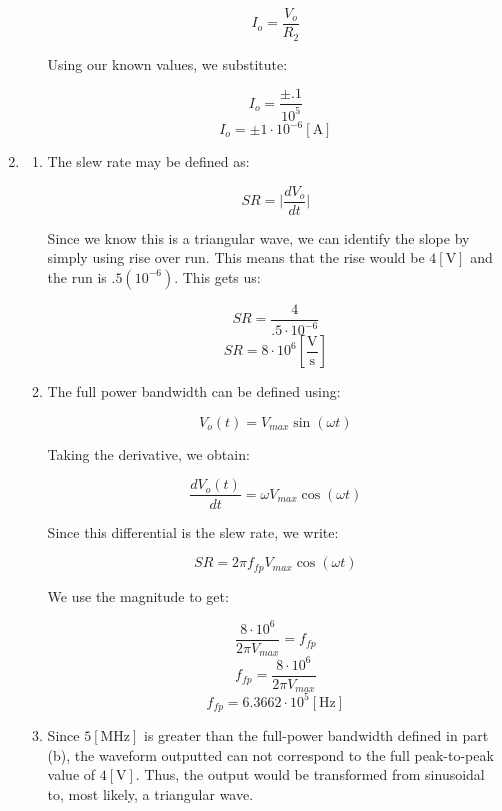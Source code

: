 \begin{enumerate}
\begin{enumerate}
        $$I_o=\frac{V_o}{R_2}$$

        Using our known values, we substitute:

        $$I_o=\frac{\pm.1}{10^5}$$
        $$\boxed{I_o=\pm1\cdot10^{-6}[\si{\ampere}]}$$

    \end{enumerate}

  \item

    \begin{enumerate}

      \item 

        The slew rate may be defined as:

        $$SR=\Big|\frac{dV_o}{dt}\Big|$$

        Since we know this is a triangular wave, we can identify the slope by simply using rise over run. This means that the rise would be $4[\si{\volt}]$ and the run is $.5(10^{-6})$. This gets us:

        $$SR=\frac{4}{.5\cdot10^{-6}}$$
        $$\boxed{SR=8\cdot10^{6}\left[ \frac{\si{\volt}}{\si{\second}} \right]}$$

      \item 

        The full power bandwidth can be defined using:

        $$V_o(t)=V_{max}\sin(\omega t)$$

        Taking the derivative, we obtain:

        $$\frac{dV_o(t)}{dt}=\omega V_{max}\cos(\omega t)$$

        Since this differential is the slew rate, we write:

        $$SR=2\pi f_{fp} V_{max}\cos(\omega t)$$

        We use the magnitude to get:

        $$\frac{8\cdot10^{6}}{2\pi V_{max}}=f_{fp}$$
        $$f_{fp}=\frac{8\cdot10^{6}}{2\pi V_{max}}$$
        $$\boxed{f_{fp}=6.3662\cdot10^5[\si{\hertz}]}$$

      \item 

        Since $5[\si{\mega\hertz}]$ is greater than the full-power bandwidth defined in part (b), the waveform outputted can not correspond to the full peak-to-peak value of $4[\si{\volt}]$. Thus, the output would be transformed from sinusoidal to, most likely, a triangular wave.

    \end{enumerate}


\end{enumerate}
